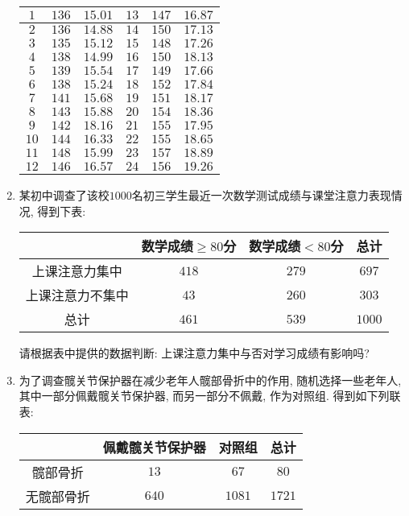 \documentclass[10pt,a4paper]{article}
\begin{document}
\begin{enumerate}[1.]
\begin{center}
\begin{longtable}{|c|c|c|c|c|c|}
\endhead
$1$ & $136$ & $15.01$ & $13$ & $147$ & $16.87$ \\ \hline
$2$ & $136$ & $14.88$ & $14$ & $150$ & $17.13$ \\ \hline
$3$ & $135$ & $15.12$ & $15$ & $148$ & $17.26$ \\ \hline
$4$ & $138$ & $14.99$ & $16$ & $150$ & $18.13$ \\ \hline
$5$ & $139$ & $15.54$ & $17$ & $149$ & $17.66$ \\ \hline
$6$ & $138$ & $15.24$ & $18$ & $152$ & $17.84$ \\ \hline
$7$ & $141$ & $15.68$ & $19$ & $151$ & $18.17$ \\ \hline
$8$ & $143$ & $15.88$ & $20$ & $154$ & $18.36$ \\ \hline
$9$ & $142$ & $18.16$ & $21$ & $155$ & $17.95$ \\ \hline
$10$ & $144$ & $16.33$ & $22$ & $155$ & $18.65$ \\ \hline
$11$ & $148$ & $15.99$ & $23$ & $157$ & $18.89$ \\ \hline
$12$ & $146$ & $16.57$ & $24$ & $156$ & $19.26$ \\ \hline
\end{longtable}
\end{center}
\item 某初中调查了该校$1000$名初三学生最近一次数学测试成绩与课堂注意力表现情况, 得到下表:
\begin{center}
\begin{tabular}{|c|c|c|c|}
\hline
& 数学成绩$\ge 80$分 & 数学成绩$< 80$分 & 总计 \\ \hline
上课注意力集中 & $418$ & $279$ & $697$ \\ \hline
上课注意力不集中 & $43$ & $260$ & $303$ \\ \hline
总计 & $461$ & $539$ & $1000$ \\ \hline
\end{tabular}
\end{center}
请根据表中提供的数据判断: 上课注意力集中与否对学习成绩有影响吗?
\item 为了调查髋关节保护器在减少老年人髋部骨折中的作用, 随机选择一些老年人, 其中一部分佩戴髋关节保护器, 而另一部分不佩戴, 作为对照组. 得到如下列联表:
\begin{center}
\begin{tabular}{|c|c|c|c|}
\hline
& 佩戴髋关节保护器 & 对照组 & 总计 \\ \hline
髋部骨折 & $13$ & $67$ & $80$ \\ \hline
无髋部骨折 & $640$ & $1081$ & $1721$ \\ \hline

\end{tabular}
\end{center}
\end{enumerate}
\end{document}
